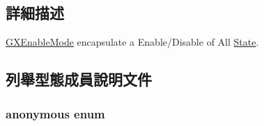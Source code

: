 \subsection{詳細描述}
\hyperlink{class_i_dream_sky_1_1_g_x_enable_mode}{G\+X\+Enable\+Mode} encapsulate a Enable/\+Disable of All \hyperlink{class_i_dream_sky_1_1_state}{State}. 

\subsection{列舉型態成員說明文件}
\subsubsection[{\texorpdfstring{anonymous enum}{anonymous enum}}]{\setlength{\rightskip}{0pt plus 5cm}anonymous enum}\hypertarget{class_i_dream_sky_1_1_g_x_enable_mode_a71ccd6deecee0cb55fd02e61a50151ee}{}\label{class_i_dream_sky_1_1_g_x_enable_mode_a71ccd6deecee0cb55fd02e61a50151ee}
